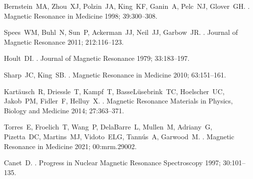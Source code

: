 \documentclass[a4paper,12pt]{article}
\begin{document}
% 
% 
\begin{thebibliography}{10}




Bernstein~MA, Zhou~XJ, Polzin~JA, King~KF, Ganin~A, Pelc~NJ, Glover~GH.
.
\newblock Magnetic Resonance in Medicine 1998; 39:300--308.

Spees~WM, Buhl~N, Sun~P, Ackerman~JJ, Neil~JJ, Garbow~JR.
.
\newblock Journal of Magnetic Resonance 2011; 212:116--123.

Hoult~DI.
.
\newblock Journal of Magnetic Resonance 1979; 33:183--197.

Sharp~JC, King~SB.
.
\newblock Magnetic Resonance in Medicine 2010; 63:151--161.

Kart{\"{a}}usch~R, Driessle~T, Kampf~T, BasseL{\"{u}}sebrink~TC, Hoelscher~UC,
  Jakob~PM, Fidler~F, Helluy~X.
.
\newblock Magnetic Resonance Materials in Physics, Biology and Medicine 2014;
  27:363--371.

Torres~E, Froelich~T, Wang~P, DelaBarre~L, Mullen~M, Adriany~G, Pizetta~DC,
  Martins~MJ, Vidoto~ELG, Tann{\'{u}}s~A, Garwood~M.
.
\newblock Magnetic Resonance in Medicine 2021; 00:mrm.29002.

Canet~D.
.
\newblock Progress in Nuclear Magnetic Resonance Spectroscopy 1997;
  30:101--135.


\end{thebibliography}
\end{document}
